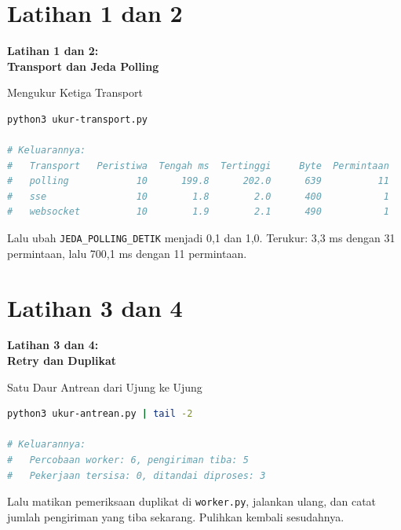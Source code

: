 \documentclass[aspectratio=169, table, 12pt]{beamer}
\begin{document}
\section{Latihan 1 dan 2}

\begin{frame}{\hfill}
  \centering
  \Huge{\textbf{Latihan 1 dan 2:\\Transport dan Jeda Polling}}
\end{frame}

\begin{frame}[fragile]{{\Large Mengukur Ketiga Transport}}
  \vspace{2pt}
\begin{lstlisting}[language=bash]
python3 ukur-transport.py

# Keluarannya:
#   Transport   Peristiwa  Tengah ms  Tertinggi     Byte  Permintaan
#   polling            10      199.8      202.0      639          11
#   sse                10        1.8        2.0      400           1
#   websocket          10        1.9        2.1      490           1
\end{lstlisting}
  \vspace{2pt}
  {\small Lalu ubah \texttt{JEDA\_POLLING\_DETIK} menjadi 0,1 dan 1,0.
  Terukur: 3,3 ms dengan 31 permintaan, lalu 700,1 ms dengan 11 permintaan.}
\end{frame}

\section{Latihan 3 dan 4}

\begin{frame}{\hfill}
  \centering
  \Huge{\textbf{Latihan 3 dan 4:\\Retry dan Duplikat}}
\end{frame}

\begin{frame}[fragile]{{\Large Satu Daur Antrean dari Ujung ke Ujung}}
  \vspace{2pt}
\begin{lstlisting}[language=bash]
python3 ukur-antrean.py | tail -2

# Keluarannya:
#   Percobaan worker: 6, pengiriman tiba: 5
#   Pekerjaan tersisa: 0, ditandai diproses: 3
\end{lstlisting}
  \vspace{4pt}
  {\small Lalu matikan pemeriksaan duplikat di \texttt{worker.py}, jalankan
  ulang, dan catat jumlah pengiriman yang tiba sekarang. Pulihkan kembali
  sesudahnya.}
\end{frame}
\end{document}
